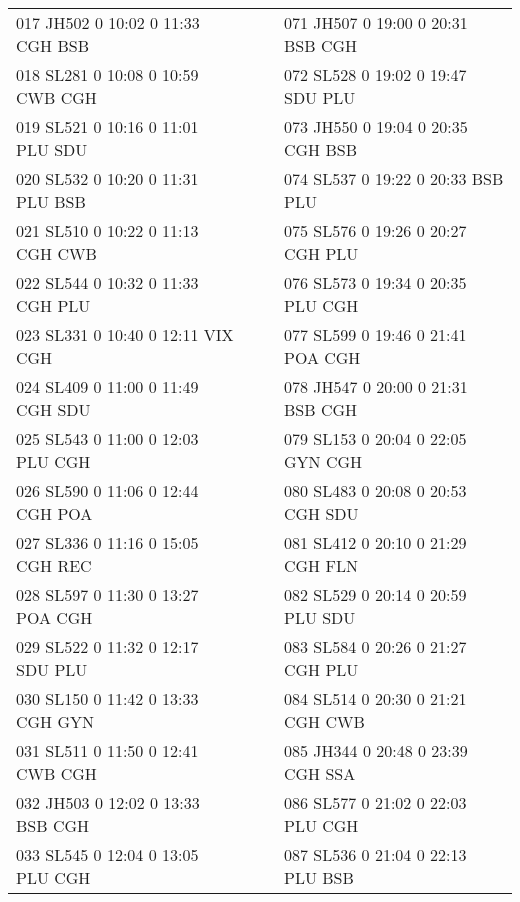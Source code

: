 \begin{scriptsize}
\begin{longtable}{l c c l}
017 JH502  0 10:02 0 11:33 CGH BSB & & & 071 JH507  0 19:00 0 20:31 BSB CGH \\

018 SL281  0 10:08 0 10:59 CWB CGH & & & 072 SL528  0 19:02 0 19:47 SDU PLU \\

019 SL521  0 10:16 0 11:01 PLU SDU & & & 073 JH550  0 19:04 0 20:35 CGH BSB \\

020 SL532  0 10:20 0 11:31 PLU BSB & & & 074 SL537  0 19:22 0 20:33 BSB PLU \\

021 SL510  0 10:22 0 11:13 CGH CWB & & & 075 SL576  0 19:26 0 20:27 CGH PLU \\

022 SL544  0 10:32 0 11:33 CGH PLU & & & 076 SL573  0 19:34 0 20:35 PLU CGH \\

023 SL331  0 10:40 0 12:11 VIX CGH & & & 077 SL599  0 19:46 0 21:41 POA CGH \\

024 SL409  0 11:00 0 11:49 CGH SDU & & & 078 JH547  0 20:00 0 21:31 BSB CGH \\

025 SL543  0 11:00 0 12:03 PLU CGH & & & 079 SL153  0 20:04 0 22:05 GYN CGH \\

026 SL590  0 11:06 0 12:44 CGH POA & & & 080 SL483  0 20:08 0 20:53 CGH SDU \\

027 SL336  0 11:16 0 15:05 CGH REC & & & 081 SL412  0 20:10 0 21:29 CGH FLN \\

028 SL597  0 11:30 0 13:27 POA CGH & & & 082 SL529  0 20:14 0 20:59 PLU SDU \\

029 SL522  0 11:32 0 12:17 SDU PLU & & & 083 SL584  0 20:26 0 21:27 CGH PLU \\

030 SL150  0 11:42 0 13:33 CGH GYN & & & 084 SL514  0 20:30 0 21:21 CGH CWB \\

031 SL511  0 11:50 0 12:41 CWB CGH & & & 085 JH344  0 20:48 0 23:39 CGH SSA \\

032 JH503  0 12:02 0 13:33 BSB CGH & & & 086 SL577  0 21:02 0 22:03 PLU CGH \\

033 SL545  0 12:04 0 13:05 PLU CGH & & & 087 SL536  0 21:04 0 22:13 PLU BSB \\


\end{longtable}
\end{scriptsize}
